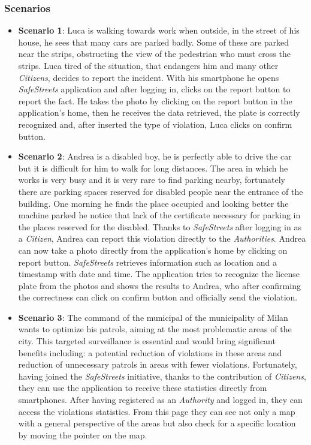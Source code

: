 \documentclass{article}
\begin{document}
\subsubsection{Scenarios}
\begin{itemize}
    \item \textbf{Scenario 1}:
    Luca is walking towards work when outside, in the street of his house, he sees that many cars are parked badly. 
    Some of these are parked near the strips, obstructing the view of the pedestrian who must cross the strips. 
    Luca tired of the situation, that endangers him and many other \textit{Citizens}, decides to report the incident. 
    With his smartphone he opens \textit{SafeStreets} application and after logging in, clicks on the report button to report the fact. 
    He takes the photo by clicking on the report button in the application's home, then he receives the data retrieved, the plate is correctly 
    recognized and, after inserted the type of violation, Luca clicks on confirm button.

    \item \textbf{Scenario 2}:
    Andrea is a disabled boy, he is perfectly able to drive the car but it is difficult for him to walk for long distances. 
    The area in which he works is very busy and it is very rare to find parking nearby, fortunately there are parking 
    spaces reserved for disabled people near the entrance of the building. One morning he finds the place occupied and looking 
    better the machine parked he notice that lack of the certificate necessary for parking in the places reserved for the disabled. 
    Thanks to \textit{SafeStreets} after logging in as a \textit{Citizen}, Andrea can report this violation directly to the \textit{Authorities}. 
    Andrea can now take a photo directly from the application's home by clicking on report button. \textit{SafeStreets} retrieves information such as 
    location and a timestamp with date and time. The application tries to recognize the license plate from the photos and shows the results to Andrea, 
    who after confirming the correctness can click on confirm button and officially send the violation.

    \item \textbf{Scenario 3}:
    The command of the municipal of the municipality of Milan wants to optimize his patrols, aiming at the most problematic areas of the city.
    This targeted surveillance is essential and would bring significant benefits including: a potential reduction of violations in these areas
    and reduction of unnecessary patrols in areas with fewer violations. Fortunately, having joined the \textit{SafeStreets} initiative, thanks to the 
    contribution of \textit{Citizens}, they can use the application to receive these statistics directly from smartphones. After having 
    registered as an \textit{Authority} and logged in, they can access the violations statistics. From this page they can see not only a map with a general
    perspective of the areas but also check for a specific location by moving the pointer on the map.  


\end{itemize}
\end{document}
